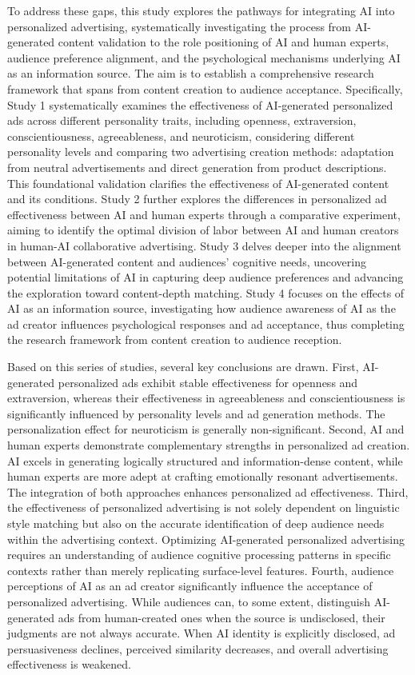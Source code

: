 To address these gaps, this study explores the pathways for integrating AI into personalized advertising, systematically investigating the process from AI-generated content validation to the role positioning of AI and human experts, audience preference alignment, and the psychological mechanisms underlying AI as an information source. The aim is to establish a comprehensive research framework that spans from content creation to audience acceptance. Specifically, Study 1 systematically examines the effectiveness of AI-generated personalized ads across different personality traits, including openness, extraversion, conscientiousness, agreeableness, and neuroticism, considering different personality levels and comparing two advertising creation methods: adaptation from neutral advertisements and direct generation from product descriptions. This foundational validation clarifies the effectiveness of AI-generated content and its conditions. Study 2 further explores the differences in personalized ad effectiveness between AI and human experts through a comparative experiment, aiming to identify the optimal division of labor between AI and human creators in human-AI collaborative advertising. Study 3 delves deeper into the alignment between AI-generated content and audiences' cognitive needs, uncovering potential limitations of AI in capturing deep audience preferences and advancing the exploration toward content-depth matching. Study 4 focuses on the effects of AI as an information source, investigating how audience awareness of AI as the ad creator influences psychological responses and ad acceptance, thus completing the research framework from content creation to audience reception.  

Based on this series of studies, several key conclusions are drawn. First, AI-generated personalized ads exhibit stable effectiveness for openness and extraversion, whereas their effectiveness in agreeableness and conscientiousness is significantly influenced by personality levels and ad generation methods. The personalization effect for neuroticism is generally non-significant. Second, AI and human experts demonstrate complementary strengths in personalized ad creation. AI excels in generating logically structured and information-dense content, while human experts are more adept at crafting emotionally resonant advertisements. The integration of both approaches enhances personalized ad effectiveness. Third, the effectiveness of personalized advertising is not solely dependent on linguistic style matching but also on the accurate identification of deep audience needs within the advertising context. Optimizing AI-generated personalized advertising requires an understanding of audience cognitive processing patterns in specific contexts rather than merely replicating surface-level features. Fourth, audience perceptions of AI as an ad creator significantly influence the acceptance of personalized advertising. While audiences can, to some extent, distinguish AI-generated ads from human-created ones when the source is undisclosed, their judgments are not always accurate. When AI identity is explicitly disclosed, ad persuasiveness declines, perceived similarity decreases, and overall advertising effectiveness is weakened.  

